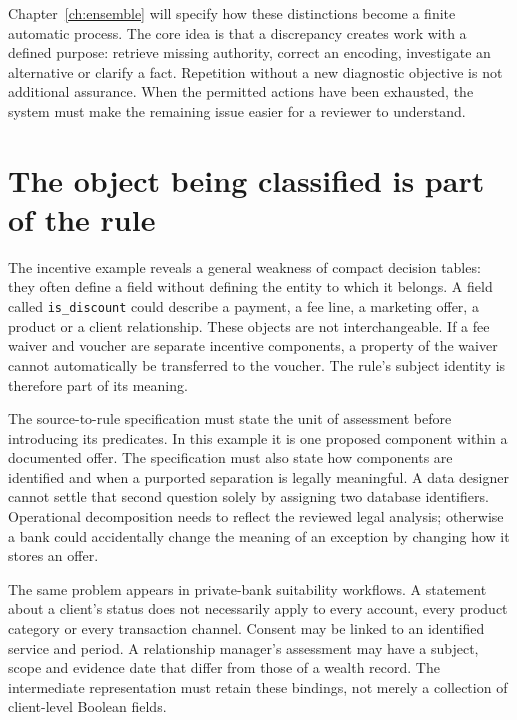 Chapter~\ref{ch:ensemble} will specify how these distinctions become a finite
automatic process. The core idea is that a discrepancy creates work with a
defined purpose: retrieve missing authority, correct an encoding, investigate an
alternative or clarify a fact. Repetition without a new diagnostic objective is
not additional assurance. When the permitted actions have been exhausted, the
system must make the remaining issue easier for a reviewer to understand.

\section{The object being classified is part of the rule}
\label{merge:M01:05}

\label{sec:problem-objects}
The incentive example reveals a general weakness of compact decision tables:
they often define a field without defining the entity to which it belongs. A
field called \texttt{is\_discount} could describe a payment, a fee line, a
marketing offer, a product or a client relationship. These objects are not
interchangeable. If a fee waiver and voucher are separate incentive components,
a property of the waiver cannot automatically be transferred to the voucher.
The rule's subject identity is therefore part of its meaning.

The source-to-rule specification must state the unit of assessment before
introducing its predicates. In this example it is one proposed component within
a documented offer. The specification must also state how components are
identified and when a purported separation is legally meaningful. A data
designer cannot settle that second question solely by assigning two database
identifiers. Operational decomposition needs to reflect the reviewed legal
analysis; otherwise a bank could accidentally change the meaning of an exception
by changing how it stores an offer.


The same problem appears in private-bank suitability workflows. A statement
about a client's status does not necessarily apply to every account, every
product category or every transaction channel. Consent may be linked to an
identified service and period. A relationship manager's assessment may have a
subject, scope and evidence date that differ from those of a wealth record.
The intermediate representation must retain these bindings, not merely a
collection of client-level Boolean fields.

